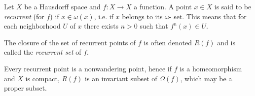 \documentclass[12pt]{article}
\begin{document}
Let $X$ be a Hausdorff space and $f\colon X\to X$ a function. A point $x\in X$ is said to be \emph{recurrent} (for $f$) if $x\in \omega(x)$, i.e. if $x$ belongs to its $\omega$- set. This means that for each neighborhood $U$ of $x$ there exists $n>0$ such that $f^n(x)\in U$.

The closure of the set of recurrent points of $f$ is often denoted $R(f)$ and is called the \emph{recurrent set} of $f$.

Every recurrent point is a nonwandering point, hence if $f$ is a homeomorphism and $X$ is compact, $R(f)$ is an invariant subset of $\Omega(f)$, which may be a proper subset.
\end{document}
